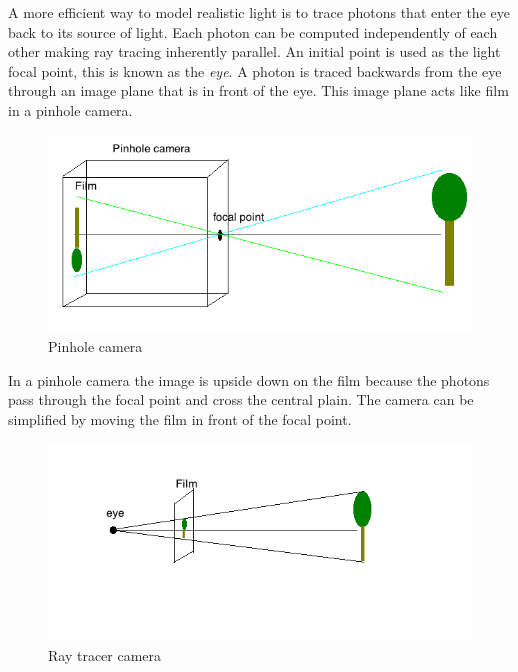 \documentclass[11pt,a4paper,oneside]{article}
\begin{document}
A more efficient way to model realistic light is to trace photons that enter the eye back to its source of light.  Each photon can be computed independently of each other making ray tracing inherently parallel.  An initial point is used as the light focal point, this is known as the \textit{eye}.  A photon is traced backwards from the eye through an image plane that is in front of the eye.  This image plane acts like film in a pinhole camera.  

\begin{figure}[H]
\begin{center}
\includegraphics[scale=0.6]{pineholecamera.png} 
\caption{Pinhole camera}
\label{pinhole-camera}
\end{center}
\end{figure}

In a pinhole camera the image is upside down on the film because the photons pass through the focal point and cross the central plain.  The camera can be simplified by moving the film in front of the focal point.

 \begin{figure}[H]
 \begin{center}
\includegraphics[scale=0.6]{raycamera.png} 
\caption{Ray tracer camera}
\label{ray-camera}
\end{center}
\end{figure}
\end{document}
